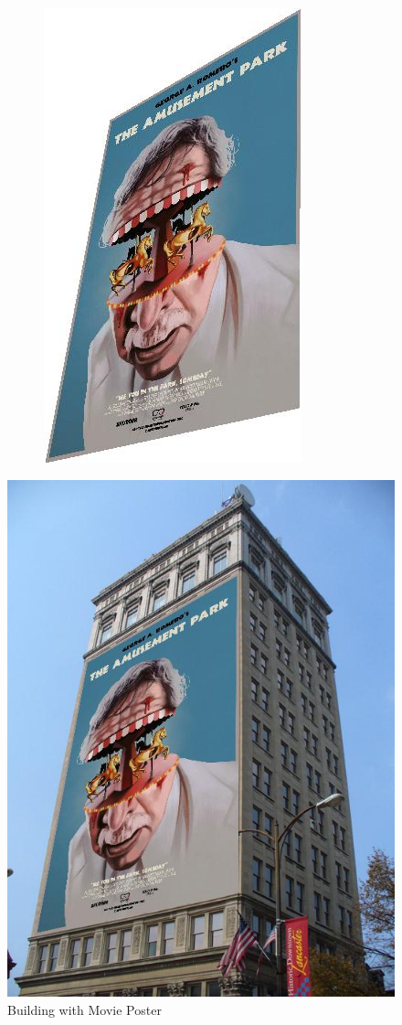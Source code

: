 \documentclass{article}
\begin{document}
\begin{figure}[H]
\begin{subfigure}{.3\textwidth}
        \includegraphics[scale=0.1]{q2/output/transform.jpg}
        \label{fig 1}
    \end{subfigure}
\end{figure}
\begin{figure}[H]
    \centering
    \includegraphics[scale=0.3]{q2/output/output.jpg}
    \caption{Building with Movie Poster}  
    \label{fig 2}
\end{figure}
\end{document}
